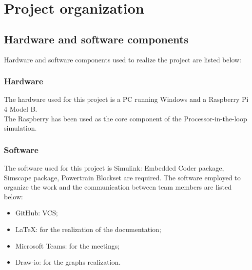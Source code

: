 \documentclass[12pt,a4paper]{report}
\begin{document}
\chapter{Project organization}
\section{Hardware and software components}
Hardware and software components used to realize the project are listed below:
\subsection{Hardware}
The hardware used for this project is a PC running Windows and a Raspberry Pi 4 Model B.\\
The Raspberry has been used as the core component of the Processor-in-the-loop simulation.
\subsection{Software}
The software used for this project is Simulink: Embedded Coder package, Simscape package, Powertrain Blockset are required.
The software employed to organize the work and the communication between team members are listed below:
\begin{itemize}
	\item GitHub: VCS;
	\item LaTeX: for the realization of the documentation;
	\item Microsoft Teams: for the meetings;
	\item Draw-io: for the graphs realization.
\end{itemize}
\end{document}
